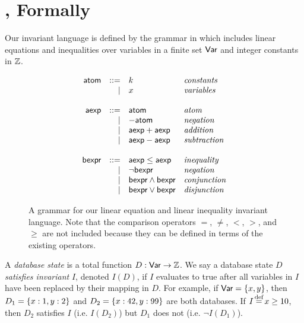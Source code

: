 \section{\iconfluence{}, Formally}\label{sec:formalism}
Our invariant language is defined by the grammar in 
which includes linear equations and inequalities over variables in a finite set
$\textsf{Var}$ and integer constants in $\mathbb{Z}$.

\begin{figure}[h]
  \centering

  \newcommand{\atom}{\textsf{atom}}
  \newcommand{\aexp}{\textsf{aexp}}
  \newcommand{\bexp}{\textsf{bexpr}}
  \begin{gather*}
    \begin{array}{rrll}
      \atom & ::= & k & \text{\emph{constants}} \\
            & |   & x & \text{\emph{variables}} \\
      &&& \\
      \aexp  & ::= & \atom         & \text{\emph{atom}} \\
             & |   & -\atom        & \text{\emph{negation}} \\
             & |   & \aexp + \aexp & \text{\emph{addition}} \\
             & |   & \aexp - \aexp & \text{\emph{subtraction}} \\
      &&& \\
      \bexp  & ::= & \aexp \leq \aexp  & \text{\emph{inequality}} \\
             & |   & \lnot \bexp       & \text{\emph{negation}} \\
             & |   & \bexp \land \bexp & \text{\emph{conjunction}} \\
             & |   & \bexp \lor \bexp  & \text{\emph{disjunction}} \\
    \end{array}
  \end{gather*}

  \caption{
    A grammar for our linear equation and linear inequality invariant language.
    Note that the comparison operators $=$, $\neq$, $<$, $>$, and $\geq$ are
    not included because they can be defined in terms of the existing
    operators.
  }
  \label{fig:invariant-grammar}
\end{figure}

A \emph{database state} is a total function $D: \textsf{Var} \to \mathbb{Z}$.  We say a
database state $D$ \emph{satisfies invariant} $I$, denoted $I(D)$, if $I$
evaluates to true after all variables in $I$ have been replaced by their
mapping in $D$.
%
For example, if $\textsf{Var} = \left\{x, y\right\}$, then $D_1 = \left\{x:1, y:2\right\}$ and $D_2 =
\left\{x:42, y:99\right\}$ are both databases. If $I \defeq x \geq 10$, then $D_2$
satisfies $I$ (i.e. $I(D_2)$) but $D_1$ does not (i.e. $\lnot I(D_1)$).

